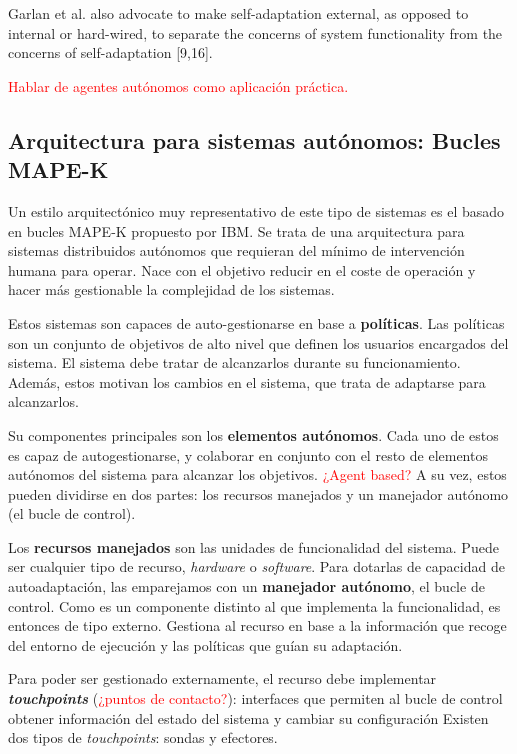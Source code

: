 Garlan et al. also advocate to make self-adaptation external, as opposed to internal or hard-wired, to separate the concerns of system
functionality from the concerns of self-adaptation [9,16].

\textcolor{red}{Hablar de agentes autónomos como aplicación práctica. \cite{savaglioAgentbasedInternetThings2020}}

\subsection{Arquitectura para sistemas autónomos: Bucles MAPE-K}

Un estilo arquitectónico muy representativo de este tipo de sistemas es el basado en bucles MAPE-K \cite{ibmcorporationArchitecturalBlueprintAutonomic2006, fonsServiciosAdaptivereadyPara2021} propuesto por IBM. Se trata de una arquitectura para sistemas distribuidos autónomos que requieran del mínimo de intervención humana para operar. Nace con el objetivo reducir en el coste de operación y hacer más gestionable la complejidad de los sistemas.

Estos sistemas son capaces de auto-gestionarse en base a \textbf{políticas}. Las políticas son un conjunto de objetivos de alto nivel que definen los usuarios encargados del sistema. El sistema debe tratar de alcanzarlos durante su funcionamiento. Además, estos motivan los cambios en el sistema, que trata de adaptarse para alcanzarlos.

Su componentes principales son los \textbf{elementos autónomos}. Cada uno de estos es capaz de autogestionarse, y colaborar en conjunto con el resto de elementos autónomos del sistema  para alcanzar los objetivos. \textcolor{red}{¿Agent based?} A su vez, estos pueden dividirse en dos partes: los recursos manejados y un manejador autónomo (el bucle de control).

Los \textbf{recursos manejados} son las unidades de funcionalidad del sistema. Puede ser cualquier tipo de recurso, \emph{hardware} o \emph{software}. Para dotarlas de capacidad de autoadaptación, las emparejamos con un \textbf{manejador autónomo}, el bucle de control. Como es un componente distinto al que implementa la funcionalidad, es entonces de tipo externo. Gestiona al recurso en base a la información que recoge del entorno de ejecución y las políticas que guían su adaptación.

Para poder ser gestionado externamente, el recurso debe implementar \textbf{\emph{touchpoints}} (\textcolor{red}{¿puntos de contacto?}): interfaces que permiten al bucle de control obtener información del estado del sistema y cambiar su configuración Existen dos tipos de \emph{touchpoints}: sondas y efectores.

